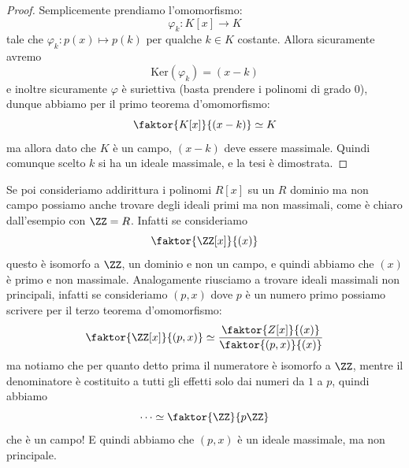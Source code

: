 \documentclass[11pt]{scrartcl}
\renewcommand{\ker}[1]{\text{Ker}\!\left(#1\right)}
\begin{document}
	\begin{proof}
		Semplicemente prendiamo l'omomorfismo:
		$$\varphi_k:K[x]\to K$$
		tale che $\varphi_k:p(x)\mapsto p(k)$ per qualche $k\in K$ costante. Allora sicuramente avremo
		$$\ker{\varphi_k}=(x-k)$$
		e inoltre sicuramente $\varphi$ è suriettiva (basta prendere i polinomi di grado $0$), dunque abbiamo per il primo teorema d'omomorfismo:
		$$\faktor{K[x]}{(x-k)}\simeq K$$
		ma allora dato che $K$ è un campo, $(x-k)$ deve essere massimale. Quindi comunque scelto $k$ si ha un ideale massimale, e la tesi è dimostrata.
	\end{proof}
	Se poi consideriamo addirittura i polinomi $R[x]$ su un $R$ dominio ma non campo possiamo anche trovare degli ideali primi ma non massimali, come è chiaro dall'esempio con $\ZZ=R$. Infatti se consideriamo 
	$$\faktor{\ZZ[x]}{(x)}$$
	questo è isomorfo a $\ZZ$, un dominio e non un campo, e quindi abbiamo che $(x)$ è primo e non massimale. Analogamente riusciamo a trovare ideali massimali non principali, infatti se consideriamo $(p,x)$ dove $p$ è un numero primo possiamo scrivere per il terzo teorema d'omomorfismo:
	$$\faktor{\ZZ[x]}{(p,x)}\simeq \frac{\faktor{Z[x]}{(x)}}{\faktor{(p,x)}{(x)}}$$
	ma notiamo che per quanto detto prima il numeratore è isomorfo a $\ZZ$, mentre il denominatore è costituito a tutti gli effetti solo dai numeri da $1$ a $p$, quindi abbiamo
	$$\dots\simeq \faktor{\ZZ}{p\ZZ}$$
	che è un campo! E quindi abbiamo che $(p,x)$ è un ideale massimale, ma non principale.
	
\end{document}

